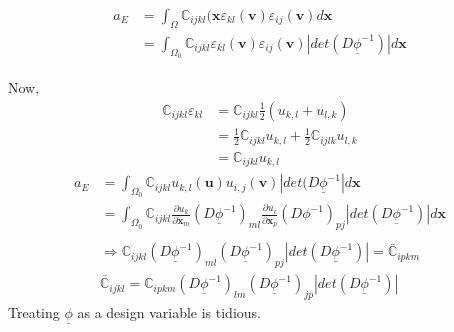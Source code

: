 \documentclass[10pt]{article}
\begin{document}
\begin{eqnarray}
\begin{split}
a_E &=\int_\Omega \mathbb{C}_{ijkl}(\textbf{x}\varepsilon_{kl}(\textbf{v})\varepsilon_{ij}(\textbf{v})d\textbf{x}\\
&=\int_{\Omega_0} \mathbb{C}_{ijkl}\varepsilon_{kl}(\textbf{v})\varepsilon_{ij}(\textbf{v})|det(D\underline{\phi}^{-1})|d\textbf{x}
\end{split}
\end{eqnarray}

Now,
\begin{equation}	\label{compliance}
\begin{split}
\mathbb{C}_{ijkl} \varepsilon_{kl} &= \mathbb{C}_{ijkl}\frac{1}{2}(u_{k,l}+u_{l,k})\\
 & =\frac{1}{2}\mathbb{C}_{ijkl}u_{k,l}+\frac{1}{2}\mathbb{C}_{ijlk}u_{l,k}\\
 & =\mathbb{C}_{ijkl}u_{k,l}
\end{split}
\end{equation}
\begin{equation}
\begin{split}
a_E &= \int_{\Omega_0}\mathbb{C}_{ijkl}u_{k,l}(\textbf{u})u_{i,j}(\textbf{v})|det(D\underline{\phi}^{-1}|d\textbf{x}\\
&= \int_{\Omega_0}\mathbb{C}_{ijkl}\frac{\partial u_k}{\partial\textbf{x}_m}(D\underline{\phi}^{-1})_{ml}\frac{\partial u_i}{\partial \textbf{x}_p}(D\phi^{-1})_{pj}|det(D\underline{\phi}^{-1})|d\textbf{x}\\
\end{split}
\end{equation}
\begin{eqnarray}
\Rightarrow \mathbb{C}_{ijkl}(D\underline{\phi}^{-1})_{ml}(D\underline{\phi}^{-1})_{pj}|det(D\underline{\phi}^{-1})| = \bar{\mathbb{C}}_{ipkm}\\
\bar{\mathbb{C}}_{ijkl} = \mathbb{C}_{ipkm}(D\underline{\phi}^{-1})_{lm}(D\underline{\phi}^{-1})_{jp}|det(D\underline{\phi}^{-1})|
\end{eqnarray}
Treating $\underline{\phi}$ as a design variable is tidious.\\
\end{document}
